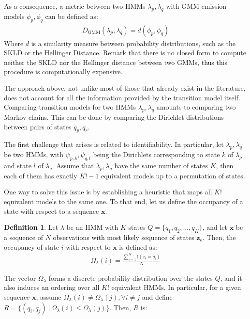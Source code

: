 \documentclass[pdftex,11pt,a4paper]{article}
\theoremstyle{definition}
\newtheorem{definition}{Definition}[section]
\theoremstyle{remark}
\newcommand*{\V}[1]{\mathbf{#1}}%
\newcommand\given[1][]{\:#1\vert\:}
\begin{document}
\par As a consequence, a metric between two HMMs $\lambda_p, \lambda_q$ with GMM emission models $\phi_p, \phi_q$ can be defined as:
\begin{align*}
D_{\text{GMM}}(\lambda_p, \lambda_q) = d( \phi_p, \phi_q )
\end{align*}
Where $d$ is a similarity measure between probability distributions, such as the SKLD or the Hellinger Distance. Remark that there is no closed form to compute neither the SKLD nor the Hellinger distance between two GMMs, thus this procedure is computationally expensive.
\par The approach above, not unlike most of those that already exist in the literature, does not account for all the information provided by the transition model itself. Comparing transition models for two HMMs $\lambda_p, \lambda_q$ amounts to comparing two Markov chains. This can be done by comparing the Dirichlet distributions between pairs of states $q_p, q_r$. 
\par The first challenge that arises is related to identifiability. In particular, let $\lambda_p, \lambda_q$ be two HMMs, with $\psi_{p, k}, \psi_{q, l}$ being the Dirichlets corresponding to state $k$ of $\lambda_p$ and state $l$ of $\lambda_q$. Assume that $\lambda_p, \lambda_q$ have the same number of states $K$, then each of them has exactly $K!-1$ equivalent models up to a permutation of states. 
\par One way to solve this issue is by establishing a heuristic that maps all $K!$ equivalent models to the same one. To that end, let us define the occupancy of a state with respect to a sequence $\V{x}$. 
\begin{definition}\label{def_occupancy}
Let $\lambda$ be an HMM with $K$ states $Q = \{q_1, q_2, ..., q_K\}$, and let $\V{x}$ be a sequence of $N$ observations with most likely sequence of states $\V{z}_o$. Then, the occupancy of state $i$ with respect to $\V{x}$ is defined as:
\begin{align*}
\Omega_\lambda(i) = \frac{\sum_{i=1}^N\mathbb{I}(z_{i} = q_i)}{N}
\end{align*}
\end{definition}
\par The vector $\Omega_\lambda$ forms a discrete probability distribution over the states $Q$, and it also induces an ordering over all $K!$ equivalent HMMs. In particular, for a given sequence $\V{x}$, assume $\Omega_\lambda(i) \neq \Omega_\lambda(j), \forall i\neq j$ and define $R = \{(q_i, q_j) \given \Omega_\lambda(i) \leq \Omega_\lambda(j)\}$. Then, $R$ is:
\end{document}
